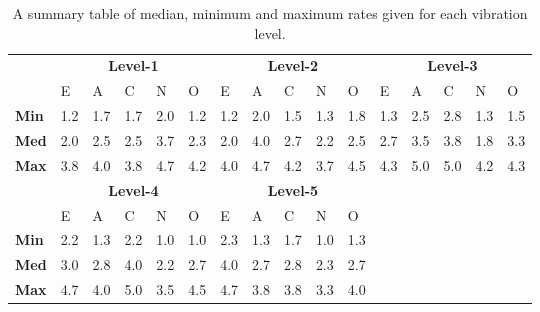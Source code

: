 \begin{table}[!htb]
    \renewcommand{\arraystretch}{1}
    \begin{center}
        \begin{tabular}{p{}|
        p{}|p{}|p{}|p{}|p{}||
        p{}|p{}|p{}|p{}|p{}||
        p{}|p{}|p{}|p{}|p{}|}
            \cline{2-16}
            & \multicolumn{5}{c||}{\textbf{Level-1}} & \multicolumn{5}{c||}{\textbf{Level-2}}
            & \multicolumn{5}{c|}{\textbf{Level-3}} \\
            \cline{2-16}
            & E & A & C & N & O & E & A & C & N & O & E & A & C & N & O      \\
            \cline{2-16}
            \textbf{Min}    & 1.2 & 1.7 & 1.7 & 2.0 & 1.2 & 1.2 & 2.0 & 1.5 & 1.3 & 1.8 & 1.3 & 2.5 & 2.8 & 1.3 & 1.5  \\
            \textbf{Med}    & 2.0 & 2.5 & 2.5 & 3.7 & 2.3 & 2.0 & 4.0 & 2.7 & 2.2 & 2.5 & 2.7 & 3.5 & 3.8 & 1.8 & 3.3  \\
            \textbf{Max}    & 3.8 & 4.0 & 3.8 & 4.7 & 4.2 & 4.0 & 4.7 & 4.2 & 3.7 & 4.5 & 4.3 & 5.0 & 5.0 & 4.2 & 4.3 \\
            \cline{2-16}
            \cline{2-11}
            &  \multicolumn{5}{|c||}{\textbf{Level-4}} & \multicolumn{5}{|c||}{\textbf{Level-5}} \\
            \cline{2-11}
            & E & A & C & N & O & E & A & C & N & O            \\
            \cline{2-11}
            \textbf{Min}    & 2.2 & 1.3 & 2.2 & 1.0 & 1.0 & 2.3 & 1.3 & 1.7 & 1.0 & 1.3    \\
            \textbf{Med}    & 3.0 & 2.8 & 4.0 & 2.2 & 2.7 & 4.0 & 2.7 & 2.8 & 2.3 & 2.7    \\
            \textbf{Max}    & 4.7 & 4.0 & 5.0 & 3.5 & 4.5 & 4.7 & 3.8 & 3.8 & 3.3 & 4.0    \\
            \cline{2-11}
        \end{tabular}
        \caption[]{A summary table of median, minimum and maximum rates given for each vibration level.\footnotemark}
        \label{table:medianMM2}
    \end{center}
\end{table}

